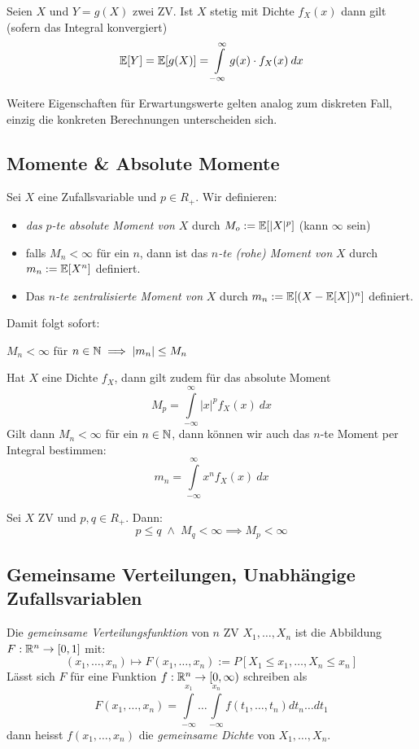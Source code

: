 \begin{satz}
Seien $X$ und $Y=g(X)$ zwei ZV. Ist $X$ stetig mit Dichte $f_X(x)$ dann gilt (sofern das Integral konvergiert)
$$ \mathbb{E}[Y] = \mathbb{E}[g(X)] = \int \limits_{-\infty}^{\infty} g(x) \cdot f_X(x) \: dx$$
\end{satz}
Weitere Eigenschaften für Erwartungswerte gelten analog zum diskreten Fall, einzig die konkreten Berechnungen unterscheiden sich.

\subsection{Momente \& Absolute Momente}

\begin{definition}
Sei $X$ eine Zufallsvariable und $p\in R_+$. Wir definieren:
\begin{itemize}
\item \textit{das} $p$\textit{-te absolute Moment von} $X$ durch $M_o := \mathbb{E}[|X|^p ]$ (kann $\infty$ sein)
\item falls $M_n < \infty$ für ein $n$, dann ist das $n$\textit{-te (rohe) Moment von} $X$ durch $m_n:= \mathbb{E}[X^n]$ definiert.
\item Das $n$\textit{-te zentralisierte Moment von} $X$ durch $m_n:= \mathbb{E}[(X - \mathbb{E}[X])^n]$ definiert.
\end{itemize}
\end{definition}
Damit folgt sofort:
\begin{korollar}
$M_n < \infty$ für $n\in\mathbb{N} \implies |m_n| \leq M_n$
\end{korollar}
Hat $X$ eine Dichte $f_X$, dann gilt zudem für das absolute Moment
$$ M_p = \int \limits_{-\infty}^\infty |x|^p f_X(x) \ dx$$ 
Gilt dann $M_n < \infty$ für ein $n\in\mathbb{N}$, dann können wir auch das $n$-te Moment per Integral bestimmen:
$$ m_n = \int \limits_{-\infty}^{\infty} x^n f_X(x) \ dx $$

\begin{satz}
Sei $X$ ZV und $p,q \in R_+$. Dann:
$$ p \leq q \; \land \; M_q < \infty \implies M_p < \infty$$
\end{satz}
\subsection{Gemeinsame Verteilungen, Unabhängige Zufallsvariablen}

\begin{definition}
Die \textit{gemeinsame Verteilungsfunktion} von $n$ ZV $X_1,\dots, X_n$ ist die Abbildung $F:\mathbb{R}^n \to [0,1]$ mit:
$$ (x_1,\dots, x_n) \mapsto F(x_1, \dots, x_n) := P[X_1 \leq x_1, \dots, X_n \leq x_n]$$
Lässt sich $F$ für eine Funktion $f:\mathbb{R}^n \to [0, \infty)$ schreiben als 
$$ F(x_1,\dots, x_n) = \int\limits_{-\infty}^{x_1} \dots \int \limits_{-\infty}^{x_n} f(t_1, \dots, t_n) dt_n \dots dt_1 $$
dann heisst $f(x_1,\dots, x_n)$ die \textit{gemeinsame Dichte} von $X_1, \dots, X_n$.
\end{definition}

